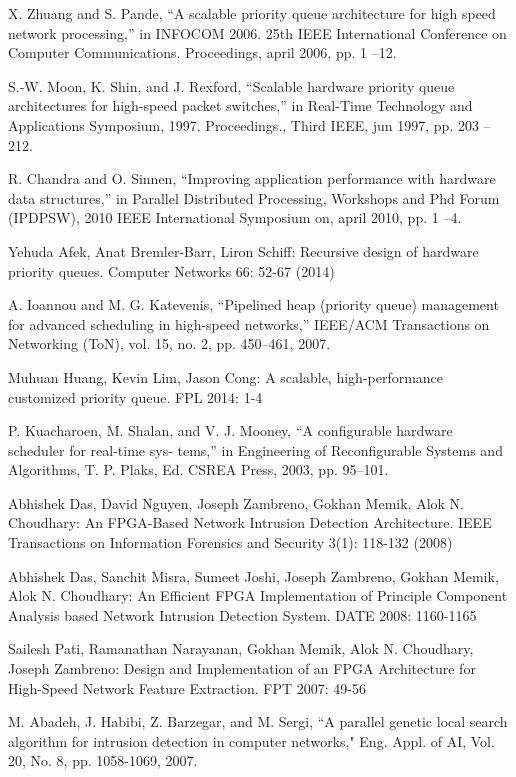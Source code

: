 \documentclass[10pt, conference, compsocconf]{IEEEtran}
\begin{document}
\begin{thebibliography}{1}
 X. Zhuang and S. Pande, “A scalable priority queue architecture for high speed network processing,” in INFOCOM 2006. 25th IEEE International Conference on Computer Communications. Proceedings, april 2006, pp. 1 –12.

 S.-W. Moon, K. Shin, and J. Rexford, “Scalable hardware priority queue architectures for high-speed packet switches,”
in Real-Time Technology and Applications Symposium, 1997. Proceedings., Third IEEE, jun 1997, pp. 203 –212.

 R. Chandra and O. Sinnen, “Improving application performance with hardware data structures,” in Parallel Distributed Processing, Workshops and Phd Forum (IPDPSW), 2010 IEEE International Symposium on, april 2010, pp. 1 –4.
	
 Yehuda Afek, Anat Bremler-Barr, Liron Schiff: Recursive design of hardware priority queues. Computer Networks 66: 52-67 (2014)

 A. Ioannou and M. G. Katevenis, “Pipelined heap (priority queue) management for advanced scheduling in high-speed networks,” IEEE/ACM Transactions on Networking (ToN), vol. 15, no. 2, pp. 450–461, 2007.

 Muhuan Huang, Kevin Lim, Jason Cong: A scalable, high-performance customized priority queue. FPL 2014: 1-4

 P. Kuacharoen, M. Shalan, and V. J. Mooney, “A configurable hardware scheduler for real-time sys-
tems,” in Engineering of Reconfigurable Systems and Algorithms, T. P. Plaks, Ed. CSREA Press, 2003,
pp. 95–101.




 Abhishek Das, David Nguyen, Joseph Zambreno, Gokhan Memik, Alok N. Choudhary:
An FPGA-Based Network Intrusion Detection Architecture. IEEE Transactions on Information Forensics and Security 3(1): 118-132 (2008)

 Abhishek Das, Sanchit Misra, Sumeet Joshi, Joseph Zambreno, Gokhan Memik, Alok N. Choudhary:
An Efficient FPGA Implementation of Principle Component Analysis based Network Intrusion Detection System. DATE 2008: 1160-1165

 Sailesh Pati, Ramanathan Narayanan, Gokhan Memik, Alok N. Choudhary, Joseph Zambreno:
Design and Implementation of an FPGA Architecture for High-Speed Network Feature Extraction. FPT 2007: 49-56

	M. Abadeh, J. Habibi, Z. Barzegar, and M. Sergi, ``A parallel genetic local search algorithm for intrusion detection in computer networks," Eng. Appl. of AI, Vol. 20, No. 8, pp. 1058-1069, 2007.


\end{thebibliography}
\end{document}
